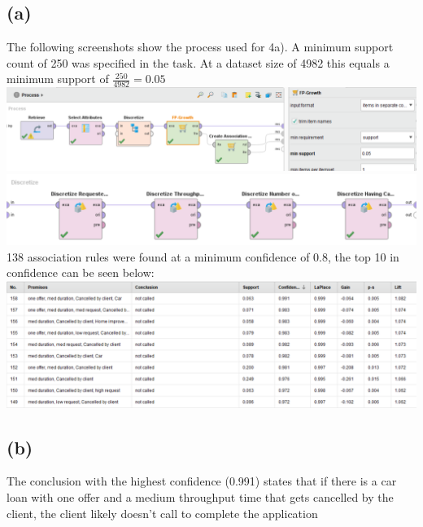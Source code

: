 \documentclass[../../main.tex]{subfiles}
\begin{document}
\subsection*{(a)}
The following screenshots show the process used for 4a). A minimum support count of 250 was specified in the task. At a dataset size of 4982 this equals a minimum support of $\frac{250}{4982}=0.05$\\
\includegraphics[width=\textwidth]{img/QUESTION_4a_PROCESS_overview.png}
\includegraphics[width=\textwidth]{img/QUESTION_4a_PROCESS_discretize.png}
138 association rules were found at a minimum confidence of 0.8, the top 10 in confidence can be seen below:\\
\includegraphics[width=\textwidth]{img/QUESTION_4a_association_rules.png}

\subsection*{(b)}
The conclusion with the highest confidence (0.991) states that if there is a car loan with one offer and a medium throughput time that gets cancelled by the client, the client likely doesn't call to complete the application 
\end{document}
